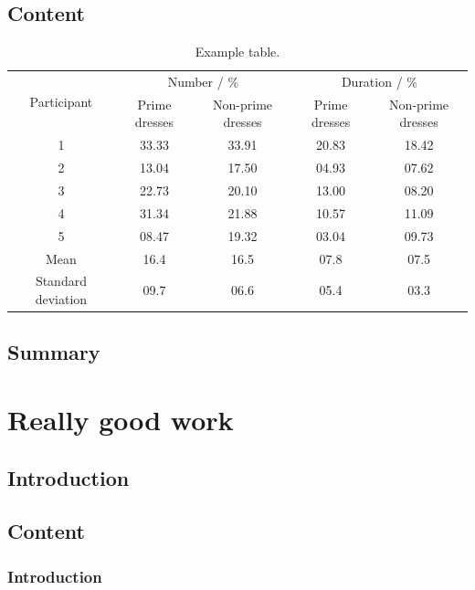 \documentclass[times,thesis]{uom_thesis_casson} %
\begin{document}
  \section{Content}
  \lipsum[1-2] \cite{ref:jCAS09,ref:jCAS09a,ref:jCAS10} \lipsum[3-5]
  \begin{table}
    \centering
    \caption{Example table.}
    \label{table:example_table}
    \begin{tabular}{ccccc}
      \toprule
      \multirow{2}{*}{Participant} & \multicolumn{2}{c}{Number / \%} & \multicolumn{2}{c}{Duration / \%} \\
                                   & Prime dresses & Non-prime dresses & Prime dresses & Non-prime dresses \\
	  \toprule
      1  & 33.33 & 33.91 & 20.83 & 18.42 \\
      2  & 13.04 & 17.50 & 04.93 & 07.62 \\
      3  & 22.73 & 20.10 & 13.00 & 08.20 \\
      4  & 31.34 & 21.88 & 10.57 & 11.09 \\
      5  & 08.47 & 19.32 & 03.04 & 09.73 \\
      \hline
      Mean & 16.4 & 16.5 & 07.8 & 07.5 \\
      Standard deviation & 09.7 & 06.6 & 05.4 & 03.3 \\
      \bottomrule
    \end{tabular}
  \end{table}  
  
  \section{Summary}
  \lipsum[6]
  
  \printbibliography[title={References},heading=subbibintoc] %
  
  
\chapter{Really good work}

  \section{Introduction}
  \lipsum[1] 
  
  \section{Content}
    \subsection{Introduction}
	\lipsum[1]
	
\end{document}
